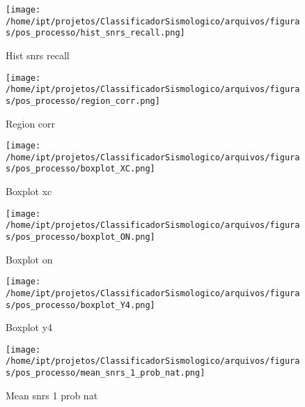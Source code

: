                     \begin{figure}[H]
                        \centering
                        \texttt{[image: /home/ipt/projetos/ClassificadorSismologico/arquivos/figuras/pos\_processo/hist\_snrs\_recall.png]}
                        \caption{Hist snrs recall}
                        \label{fig:hist_snrs_recall}
                    \end{figure}
                

                    \begin{figure}[H]
                        \centering
                        \texttt{[image: /home/ipt/projetos/ClassificadorSismologico/arquivos/figuras/pos\_processo/region\_corr.png]}
                        \caption{Region corr}
                        \label{fig:region_corr}
                    \end{figure}
                

                    \begin{figure}[H]
                        \centering
                        \texttt{[image: /home/ipt/projetos/ClassificadorSismologico/arquivos/figuras/pos\_processo/boxplot\_XC.png]}
                        \caption{Boxplot xc}
                        \label{fig:boxplot_XC}
                    \end{figure}
                

                    \begin{figure}[H]
                        \centering
                        \texttt{[image: /home/ipt/projetos/ClassificadorSismologico/arquivos/figuras/pos\_processo/boxplot\_ON.png]}
                        \caption{Boxplot on}
                        \label{fig:boxplot_ON}
                    \end{figure}
                

                    \begin{figure}[H]
                        \centering
                        \texttt{[image: /home/ipt/projetos/ClassificadorSismologico/arquivos/figuras/pos\_processo/boxplot\_Y4.png]}
                        \caption{Boxplot y4}
                        \label{fig:boxplot_Y4}
                    \end{figure}
                

                    \begin{figure}[H]
                        \centering
                        \texttt{[image: /home/ipt/projetos/ClassificadorSismologico/arquivos/figuras/pos\_processo/mean\_snrs\_1\_prob\_nat.png]}
                        \caption{Mean snrs 1 prob nat}
                        \label{fig:mean_snrs_1_prob_nat}
                    \end{figure}
                

